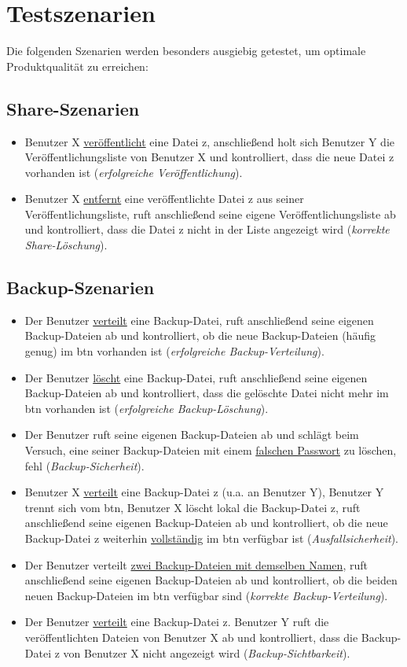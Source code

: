 \section{Testszenarien}
Die folgenden Szenarien werden besonders ausgiebig getestet, um optimale Produktqualit\"at zu erreichen:
\subsection{Share-Szenarien}
\begin{itemize}
	\item Benutzer X \underline{ver\"offentlicht} eine Datei z, anschlie\ss{}end holt sich Benutzer Y die Ver\"offentlichungsliste von Benutzer X und kontrolliert, dass die neue Datei z vorhanden ist (\textit{erfolgreiche Ver\"offentlichung}).
	\item Benutzer X \underline{entfernt} eine veröffentlichte Datei z aus seiner Ver\"offentlichungsliste, ruft anschlie\ss{}end seine eigene Ver\"offentlichungsliste ab und kontrolliert, dass die Datei z nicht in der Liste angezeigt wird (\textit{korrekte Share-L\"oschung}).
\end{itemize}

\subsection{Backup-Szenarien}
\begin{itemize}
	\item Der Benutzer \underline{verteilt} eine Backup-Datei, ruft anschlie\ss{}end seine eigenen Backup-Dateien ab und kontrolliert, ob die neue Backup-Dateien (h\"aufig genug) im \gls{btn} vorhanden ist (\textit{erfolgreiche Backup-Verteilung}).
	\item Der Benutzer \underline{l\"oscht} eine Backup-Datei, ruft anschlie\ss{}end seine eigenen Backup-Dateien ab und kontrolliert, dass die gel\"oschte Datei nicht mehr im \gls{btn} vorhanden ist (\textit{erfolgreiche Backup-L\"oschung}).
	\item Der Benutzer ruft seine eigenen Backup-Dateien ab und schl\"agt beim Versuch, eine seiner Backup-Dateien mit einem \underline{falschen Passwort} zu l\"oschen, fehl (\textit{Backup-Sicherheit}).
	\item Benutzer X \underline{verteilt} eine Backup-Datei z (u.a. an Benutzer Y), Benutzer Y trennt sich vom \gls{btn}, Benutzer X l\"oscht lokal die Backup-Datei z, ruft anschlie\ss{}end seine eigenen Backup-Dateien ab und kontrolliert, ob die neue Backup-Datei z weiterhin \underline{vollst\"andig} im \gls{btn} verf\"ugbar ist (\textit{Ausfallsicherheit}).
	\item Der Benutzer verteilt \underline{zwei Backup-Dateien mit demselben Namen}, ruft anschlie\ss{}end seine eigenen Backup-Dateien ab und kontrolliert, ob die beiden neuen Backup-Dateien im \gls{btn} verf\"ugbar sind (\textit{korrekte Backup-Verteilung}).
	\item Der Benutzer \underline{verteilt} eine Backup-Datei z. Benutzer Y ruft die ver\"offentlichten Dateien von Benutzer X ab und kontrolliert, dass die Backup-Datei z von Benutzer X nicht angezeigt wird (\textit{Backup-Sichtbarkeit}).
\end{itemize}

